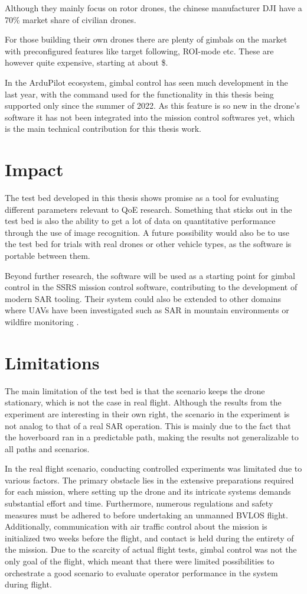 \documentclass[nofilelist]{cslthse-msc}
\begin{document}
Although they mainly focus on rotor drones, the chinese manufacturer DJI have a 70\% market share of civilian drones. 

For those building their own drones there are plenty of gimbals on the market with preconfigured features like target following, ROI-mode etc. These are however quite expensive, starting at about \$. 

In the ArduPilot ecosystem, gimbal control has seen much development in the last year, with the command used for the functionality in this thesis being supported only since the summer of 2022. As this feature is so new in the drone's software it has not been integrated into the mission control softwares yet, which is the main technical contribution for this thesis work.

\section{Impact}
The test bed developed in this thesis shows promise as a tool for evaluating different parameters relevant to QoE research. Something that sticks out in the test bed is also the ability to get a lot of data on quantitative performance through the use of image recognition. A future possibility would also be to use the test bed for trials with real drones or other vehicle types, as the software is portable between them.

Beyond further research, the software will be used as a starting point for gimbal control in the SSRS mission control software, contributing to the development of modern SAR tooling. Their system could also be extended to other domains where UAVs have been investigated such as SAR in mountain environments \cite{drones-mountain-sar} or wildfire monitoring \cite{drones-wildfire}.

\section{Limitations}
The main limitation of the test bed is that the scenario keeps the drone stationary, which is not the case in real flight. Although the results from the experiment are interesting in their own right, the scenario in the experiment is not analog to that of a real SAR operation. This is mainly due to the fact that the hoverboard ran in a predictable path, making the results not generalizable to all paths and scenarios.

In the real flight scenario, conducting controlled experiments was limitated due to various factors. The primary obstacle lies in the extensive preparations required for each mission, where setting up the drone and its intricate systems demands substantial effort and time. Furthermore, numerous regulations and safety measures must be adhered to before undertaking an unmanned BVLOS flight. Additionally, communication with air traffic control about the mission is initialized two weeks before the flight, and contact is held during the entirety of the mission. Due to the scarcity of actual flight tests, gimbal control was not the only goal of the flight, which meant that there were limited possibilities to orchestrate a good scenario to evaluate operator performance in the system during flight. 
\end{document}
